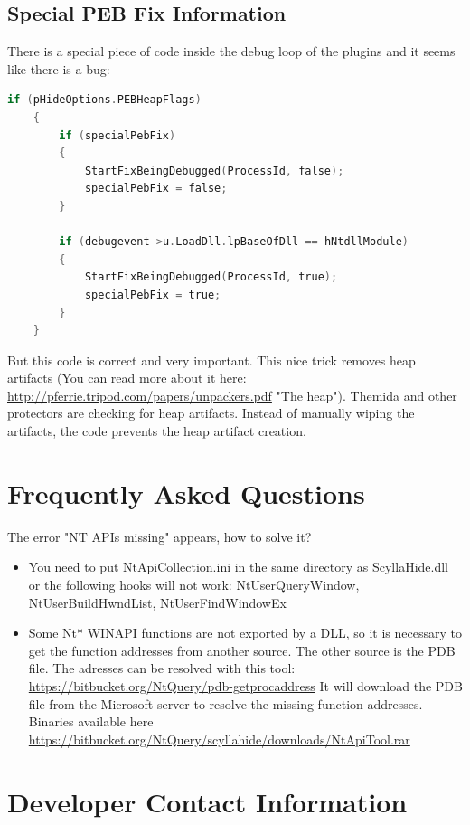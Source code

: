 \documentclass[10pt,a4paper]{article}
\begin{document}
\subsection{Special PEB Fix Information}

There is a special piece of code inside the debug loop of the plugins and it seems like there is a bug:
\begin{lstlisting}[language=C, caption=Special PEB Fix Code]
    if (pHideOptions.PEBHeapFlags)
    {
        if (specialPebFix)
        {
            StartFixBeingDebugged(ProcessId, false);
            specialPebFix = false;
        }

        if (debugevent->u.LoadDll.lpBaseOfDll == hNtdllModule)
        {
            StartFixBeingDebugged(ProcessId, true);
            specialPebFix = true;
        }
    }
\end{lstlisting}
But this code is correct and very important. This nice trick removes heap artifacts (You can read more about it here: \url{http://pferrie.tripod.com/papers/unpackers.pdf} "The heap"). Themida and other protectors are checking for heap artifacts. Instead of manually wiping the artifacts, the code prevents the heap artifact creation.

\section{Frequently Asked Questions}
The error "NT APIs missing" appears, how to solve it?
\begin{itemize}
\item You need to put NtApiCollection.ini in the same directory as ScyllaHide.dll or the following hooks will not work: NtUserQueryWindow, NtUserBuildHwndList, NtUserFindWindowEx
\item Some Nt* WINAPI functions are not exported by a DLL, so it is necessary to get the function addresses from another source. The other source is the PDB file. The adresses can be resolved with this tool: \url{https://bitbucket.org/NtQuery/pdb-getprocaddress} It will download the PDB file from the Microsoft server to resolve the missing function addresses. Binaries available here \url{https://bitbucket.org/NtQuery/scyllahide/downloads/NtApiTool.rar}
\end{itemize}

\section{Developer Contact Information}
\end{document}
